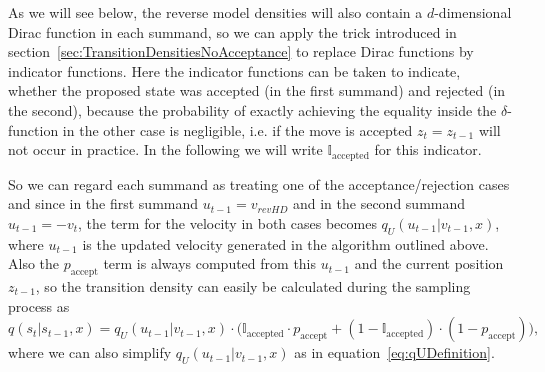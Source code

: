 As we will see below, the reverse model densities will also contain a $d$-dimensional Dirac function in each summand, so we can apply the trick introduced in section~\ref{sec:TransitionDensitiesNoAcceptance} to replace Dirac functions by indicator functions. Here the indicator functions can be taken to indicate, whether the proposed state was accepted (in the first summand) and rejected (in the second), because the probability of exactly achieving the equality inside the $\delta$-function in the other case is negligible, i.e. if the move is accepted $z_t = z_{t-1}$ will not occur in practice. In the following we will write $\mathbb{I}_\textrm{accepted}$ for this indicator.

So we can regard each summand as treating one of the acceptance/rejection cases and since in the first summand $u_{t-1} = v_{revHD}$ and in the second summand $u_{t-1} = -v_t$, the term for the velocity in both cases becomes $q_U(u_{t-1}|v_{t-1}, x)$, where $u_{t-1}$ is the updated velocity generated in the algorithm outlined above. Also the $p_\textrm{accept}$ term is always computed from this $u_{t-1}$ and the current position $z_{t-1}$, so the transition density can easily be calculated during the sampling process as
\begin{equation}
q(s_t|s_{t-1}, x) = q_U(u_{t-1}|v_{t-1}, x) \cdot \Big( \mathbb{I}_\textrm{accepted} \cdot p_{\textrm{accept}} + (1 - \mathbb{I}_\textrm{accepted}) \cdot (1- p_{\textrm{accept}}) \Big),
\end{equation}
where we can also simplify $q_U(u_{t-1}|v_{t-1}, x)$ as in equation~\eqref{eq:qUDefinition}.

